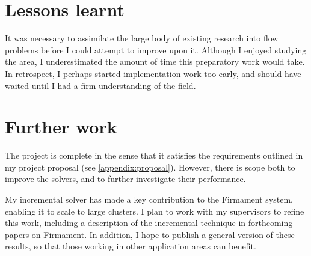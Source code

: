 
\section{Lessons learnt}

It was necessary to assimilate the large body of existing research into flow problems before I could attempt to improve upon it. Although I enjoyed studying the area, I underestimated the amount of time this preparatory work would take. In retrospect, I perhaps started implementation work too early, and should have waited until I had a firm understanding of the field.

\section{Further work}

The project is complete in the sense that it satisfies the requirements outlined in my project proposal (see \cref{appendix:proposal}). However, there is scope both to improve the solvers, and to further investigate their performance.

My incremental solver has made a key contribution to the Firmament system, enabling it to scale to large clusters. I plan to work with my supervisors to refine this work, including a description of the incremental technique in forthcoming papers on Firmament. In addition, I hope to publish a general version of these results, so that those working in other application areas can benefit.

